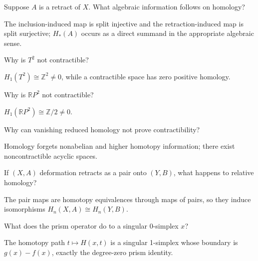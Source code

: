 \begin{problem}\label{prob:viii20-11}
Suppose \(A\) is a retract of \(X\). What algebraic information follows on homology?
\end{problem}
\begin{solution}
The inclusion-induced map is split injective and the retraction-induced map is split surjective; \(H_*(A)\) occurs as a direct summand in the appropriate algebraic sense.
\end{solution}

\begin{problem}\label{prob:viii20-12}
Why is \(T^2\) not contractible?
\end{problem}
\begin{solution}
\(H_1(T^2)\cong\mathbb Z^2\ne0\), while a contractible space has zero positive homology.
\end{solution}

\begin{problem}\label{prob:viii20-13}
Why is \(\mathbb RP^2\) not contractible?
\end{problem}
\begin{solution}
\(H_1(\mathbb RP^2)\cong\mathbb Z/2\ne0\).
\end{solution}

\begin{problem}\label{prob:viii20-14}
Why can vanishing reduced homology not prove contractibility?
\end{problem}
\begin{solution}
Homology forgets nonabelian and higher homotopy information; there exist noncontractible acyclic spaces.
\end{solution}

\begin{problem}\label{prob:viii20-15}
If \((X,A)\) deformation retracts as a pair onto \((Y,B)\), what happens to relative homology?
\end{problem}
\begin{solution}
The pair maps are homotopy equivalences through maps of pairs, so they induce isomorphisms \(H_n(X,A)\cong H_n(Y,B)\).
\end{solution}

\begin{problem}\label{prob:viii20-16}
What does the prism operator do to a singular 0-simplex \(x\)?
\end{problem}
\begin{solution}
The homotopy path \(t\mapsto H(x,t)\) is a singular 1-simplex whose boundary is \(g(x)-f(x)\), exactly the degree-zero prism identity.
\end{solution}

